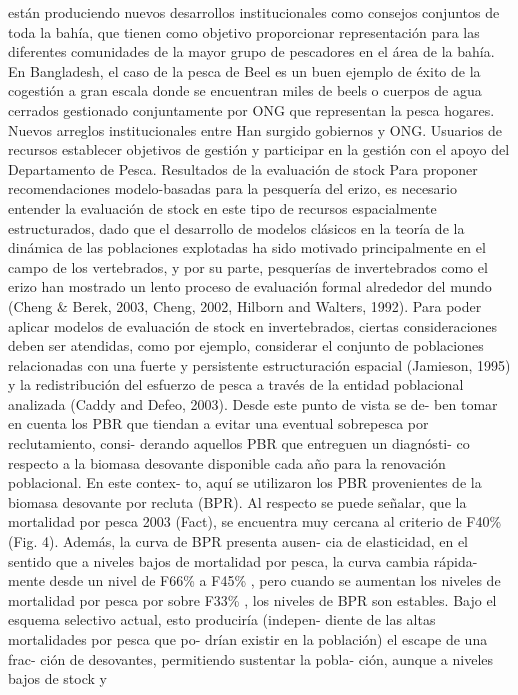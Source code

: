 \documentclass[
]{article}
\begin{document}
están produciendo nuevos desarrollos institucionales como consejos
conjuntos de toda la bahía, que tienen como objetivo proporcionar
representación para las diferentes comunidades de la mayor grupo de
pescadores en el área de la bahía. En Bangladesh, el caso de la pesca de
Beel es un buen ejemplo de éxito de la cogestión a gran escala donde se
encuentran miles de beels o cuerpos de agua cerrados gestionado
conjuntamente por ONG que representan la pesca hogares. Nuevos arreglos
institucionales entre Han surgido gobiernos y ONG. Usuarios de recursos
establecer objetivos de gestión y participar en la gestión con el apoyo
del Departamento de Pesca. Resultados de la evaluación de stock Para
proponer recomendaciones modelo-basadas para la pesquería del erizo, es
necesario entender la evaluación de stock en este tipo de recursos
espacialmente estructurados, dado que el desarrollo de modelos clásicos
en la teoría de la dinámica de las poblaciones explotadas ha sido
motivado principalmente en el campo de los vertebrados, y por su parte,
pesquerías de invertebrados como el erizo han mostrado un lento proceso
de evaluación formal alrededor del mundo (Cheng \& Berek, 2003, Cheng,
2002, Hilborn and Walters, 1992). Para poder aplicar modelos de
evaluación de stock en invertebrados, ciertas consideraciones deben ser
atendidas, como por ejemplo, considerar el conjunto de poblaciones
relacionadas con una fuerte y persistente estructuración espacial
(Jamieson, 1995) y la redistribución del esfuerzo de pesca a través de
la entidad poblacional analizada (Caddy and Defeo, 2003). Desde este
punto de vista se de- ben tomar en cuenta los PBR que tiendan a evitar
una eventual sobrepesca por reclutamiento, consi- derando aquellos PBR
que entreguen un diagnósti- co respecto a la biomasa desovante
disponible cada año para la renovación poblacional. En este contex- to,
aquí se utilizaron los PBR provenientes de la biomasa desovante por
recluta (BPR). Al respecto se puede señalar, que la mortalidad por pesca
2003 (Fact), se encuentra muy cercana al criterio de F40\% (Fig. 4).
Además, la curva de BPR presenta ausen- cia de elasticidad, en el
sentido que a niveles bajos de mortalidad por pesca, la curva cambia
rápida- mente desde un nivel de F66\% a F45\% , pero cuando se aumentan
los niveles de mortalidad por pesca por sobre F33\% , los niveles de BPR
son estables. Bajo el esquema selectivo actual, esto produciría
(indepen- diente de las altas mortalidades por pesca que po- drían
existir en la población) el escape de una frac- ción de desovantes,
permitiendo sustentar la pobla- ción, aunque a niveles bajos de stock y
\end{document}
